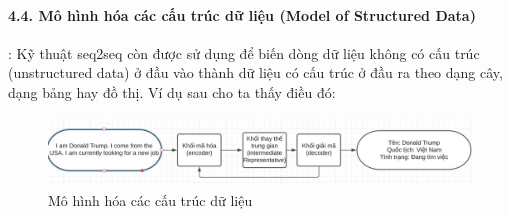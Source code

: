 \paragraph{4.4. Mô hình hóa các cấu trúc dữ liệu (Model of Structured Data)}: Kỹ thuật seq2seq còn được sử dụng để biến dòng dữ liệu không có cấu trúc (unstructured data) ở đầu vào thành dữ liệu có cấu trúc ở đầu ra theo dạng cây,  dạng bảng hay đồ thị.  Ví dụ sau cho ta thấy điều đó:

\begin{figure}
	\centering
	\includegraphics[scale=0.3]{img/structure_data.jpg}
	\caption{Mô hình hóa các cấu trúc dữ liệu}
	\label{structure_data}
\end{figure}